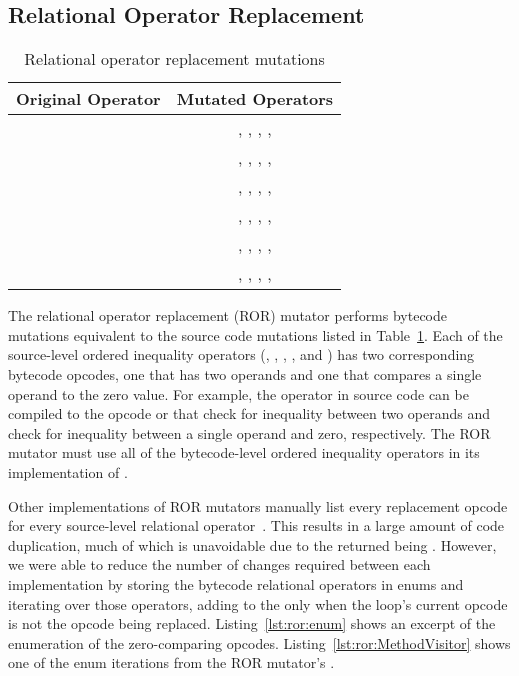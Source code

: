 \subsection{Relational Operator Replacement}

\begin{table}
  \centering
  \begin{tabular}{c c}
    \toprule
    Original Operator & Mutated Operators                                                        \\
    \midrule
    \java{>}          & \phantom{\java{>},} \java{>=}, \java{==}, \java{<=}, \java{<}, \java{!=} \\
    \java{>=}         & \java{>}, \phantom{\java{>=},} \java{==}, \java{<=}, \java{<}, \java{!=} \\
    \java{==}         & \java{>}, \java{>=}, \phantom{\java{==},} \java{<=}, \java{<}, \java{!=} \\
    \java{<=}         & \java{>}, \java{>=}, \java{==}, \phantom{\java{<=},} \java{<}, \java{!=} \\
    \java{<}          & \java{>}, \java{>=}, \java{==}, \java{<=}, \phantom{\java{<},} \java{!=} \\
    \java{!=}         & \java{>}, \java{>=}, \java{==}, \java{<=}, \java{<}\phantom{, \java{!=}} \\
    \bottomrule
  \end{tabular}
  \caption[ROR mutations]{Relational operator replacement mutations}
  \label{tab:ror:src_ops}
\end{table}

The relational operator replacement (ROR) mutator performs bytecode mutations equivalent to the source code mutations listed in Table~\ref{tab:ror:src_ops}.
Each of the source-level ordered inequality operators (\java{>}, \java{>=}, \java{==}, \java{<=}, and \java{<}) has two corresponding bytecode opcodes, one that has two operands and one that compares a single operand to the zero value.
For example, the \java{!=} operator in source code can be compiled to the opcode  or  that check for inequality between two operands and check for inequality between a single operand and zero, respectively.
The ROR mutator must use all of the bytecode-level ordered inequality operators in its implementation of .

Other implementations of ROR mutators manually list every replacement opcode for every source-level relational operator~\cite{ProdigyXable}.
This results in a large amount of code duplication, much of which is unavoidable due to the  returned being .
However, we were able to reduce the number of changes required between each implementation by storing the bytecode relational operators in enums and iterating over those operators, adding to the  only when the loop's current opcode is not the opcode being replaced.
Listing~\ref{lst:ror:enum} shows an excerpt of the enumeration of the zero-comparing opcodes.
Listing~\ref{lst:ror:MethodVisitor} shows one of the enum iterations from the ROR mutator's .

